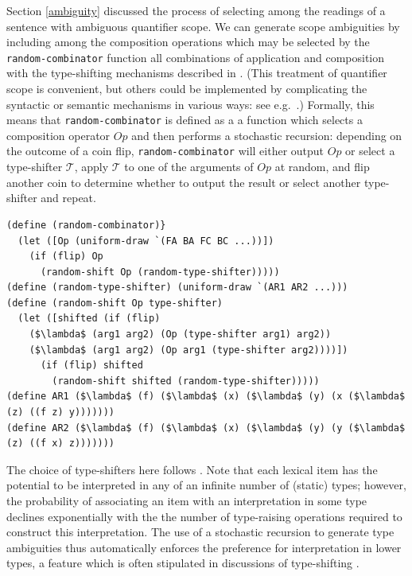 \documentclass[pdfextras]{handbook}
\begin{document}
Section \ref{ambiguity} discussed the process of selecting among the readings of a sentence with ambiguous quantifier scope. 
We can generate scope ambiguities by including among the composition operations which may be selected by the \lstinline{random-combinator} function all combinations of application and composition with the type-shifting mechanisms described in \citet{hendriks93,barker05}. (This treatment of quantifier scope is convenient, but others could be implemented by complicating the syntactic or semantic mechanisms in various ways: see e.g.\ \citet{may77,steedman2012taking}.)
Formally, this means that \lstinline{random-combinator} is defined as a a function which selects a composition operator $\mathit{Op}$ and then performs a stochastic recursion: depending on the outcome of a coin flip, \lstinline{random-combinator} will either output $\mathit{Op}$ or select a type-shifter $\mathcal{T}$, apply $\mathcal{T}$ to one of the arguments of $\mathit{Op}$ at random, and flip another coin to determine whether to output the result or select another type-shifter and repeat.
\begin{lstlisting}[mathescape]
(define (random-combinator)}
  (let ([Op (uniform-draw `(FA BA FC BC ...))])
    (if (flip) Op
      (random-shift Op (random-type-shifter)))))
(define (random-type-shifter) (uniform-draw `(AR1 AR2 ...)))
(define (random-shift Op type-shifter)
  (let ([shifted (if (flip)
    ($\lambda$ (arg1 arg2) (Op (type-shifter arg1) arg2))
    ($\lambda$ (arg1 arg2) (Op arg1 (type-shifter arg2))))])
      (if (flip) shifted
        (random-shift shifted (random-type-shifter)))))
(define AR1 ($\lambda$ (f) ($\lambda$ (x) ($\lambda$ (y) (x ($\lambda$ (z) ((f z) y)))))))
(define AR2 ($\lambda$ (f) ($\lambda$ (x) ($\lambda$ (y) (y ($\lambda$ (z) ((f x) z)))))))
\end{lstlisting}
The choice of type-shifters here follows \citet[][pp.453ff.]{barker05}. 
Note that each lexical item has the potential to be interpreted in any of an infinite number of (static) types; however, the probability of associating an item with an interpretation in some type declines exponentially with the the number of type-raising operations required to construct this interpretation. 
The use of a stochastic recursion to generate type ambiguities thus automatically enforces the preference for interpretation in lower types, a feature which is often stipulated in discussions of type-shifting \citep{partee1983generalized,partee1987noun}.
\end{document}
